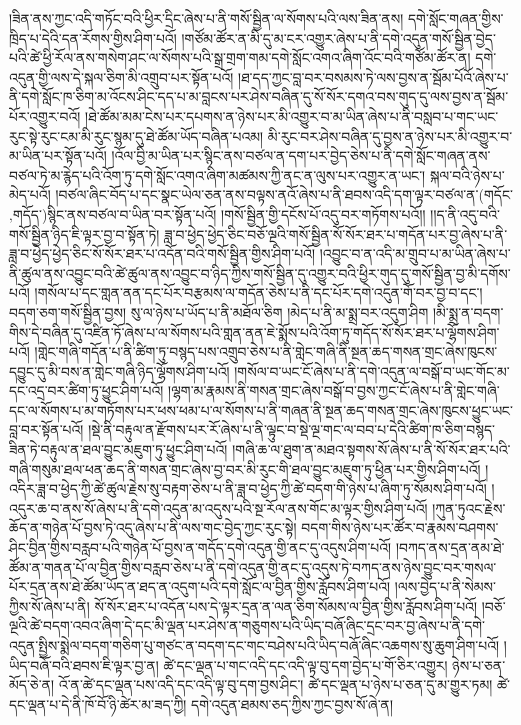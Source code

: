 །ཟིན་ནས་ཀྱང་འདི་གཏོང་བའི་ཕྱིར་དྲིང་ཞེས་པ་ནི་གསོ་སྦྱིན་ལ་སོགས་པའི་ལས་ཟིན་ནས། དགེ་སློང་གཞན་གྱིས་ཁྲིད་པ་དེའི་དན་རོགས་གྱིས་ཤིག་པའོ། །གཙོམ་ཚོར་ན་མི་དུ་མ་ངར་འགྱུར་ཞེས་པ་ནི་དགེ་འདུན་གསོ་སྦྱིན་བྱེད་པའི་ཚེ་ཕྱི་རོལ་ནས་གསེག་ཤང་ལ་སོགས་པའི་སྒྲ་གྲག་གམ་དགེ་སློང་འགའ་ཞིག་འོང་བའི་གཙོམ་ཚོར་ན། དགེ་འདུན་གྱི་ལས་དེ་སྐལ་ཅིག་མི་འགྲུབ་པར་སྟོན་པའོ། །ཐ་དད་ཀྱང་བླ་བར་བསམས་ཏེ་ལས་བྱས་ན་སྦོམ་པོའོ་ཞེས་པ་ནི་དགེ་སློང་ཁ་ཅིག་མ་འོངས་ཤིང་དད་པ་མ་བླངས་པར་ཤེས་བཞིན་དུ་སོ་སོར་དགའ་བས་གུད་དུ་ལས་བྱས་ན་སྦོམ་པོར་འགྱུར་བའོ། །ཐེ་ཚོམ་མམ་ངེས་པར་དཔགས་ན་ཉེས་པར་མི་འགྱུར་བ་མ་ཡིན་ཞེས་པ་ནི་བསླབ་པ་གང་ཡང་རུང་སྟེ་རུང་ངམ་མི་རུང་སྙམ་དུ་ཐེ་ཚོམ་ཡོད་བཞིན་པའམ། མི་རུང་བར་ཤེས་བཞིན་དུ་བྱས་ན་ཉེས་པར་མི་འགྱུར་བ་མ་ཡིན་པར་སྟོན་པའོ། །འོལ་བྱི་མ་ཡིན་པར་སྙིང་ནས་བཙལ་ན་དག་པར་བྱེད་ཅེས་པ་ནི་དགེ་སློང་གཞན་ནས་བཙལ་ཏེ་མ་རྙེད་པའི་འོག་ཏུ་དགེ་སློང་འགའ་ཞིག་མཚམས་ཀྱི་ནང་ན་ལུས་པར་འགྱུར་ན་ཡང་། སྐལ་བའི་ཉེས་པ་མེད་པའོ། །བཙལ་ཞིང་བོད་པ་དང་སྣང་ཡེལ་ཅན་ནས་བལྟས་ནའོ་ཞེས་པ་ནི་ཐབས་འདི་དག་ལྟར་བཙལ་ན་(གདོང་‚གདོད་)སྙིང་ནས་བཙལ་བ་ཡིན་བར་སྟོན་པའོ། །གསོ་སྦྱིན་གྱི་དངོས་པོ་འདུ་བར་གཏོགས་པའོ།། །།ད་ནི་འདུ་བའི་གསོ་སྦྱིན་ཉིད་ཇི་ལྟར་བྱ་བ་སྟོན་ཏེ། ཟླ་བ་ཕྱེད་ཕྱེད་ཅིང་བཅོ་ལྔའི་གསོ་སྦྱིན་སོ་སོར་ཐར་པ་གདོན་པར་བྱ་ཞེས་པ་ནི་ཟླ་བ་ཕྱེད་ཕྱེད་ཅིང་སོ་སོར་ཐར་པ་འདོན་བའི་གསོ་སྦྱིན་གྱིས་ཤིག་པའོ། །འབྱུང་བ་ན་འདི་མ་གྲུབ་པ་མ་ཡིན་ཞེས་པ་ནི་ཚུལ་ནས་འབྱུང་བའི་ཚེ་ཚུལ་ནས་འབྱུང་བ་ཉིད་ཀྱིས་གསོ་སྦྱིན་དུ་འགྱུར་བའི་ཕྱིར་གུད་དུ་གསོ་སྦྱིན་བྱ་མི་དགོས་པའོ། །གསོལ་པ་དང་གླན་ནན་དང་པོར་བརྩམས་ལ་གདོན་ཅེས་པ་ནི་དང་པོར་དགེ་འདུན་གོ་བར་བྱ་བ་དང་། བདག་ཅག་གསོ་སྦྱིན་བྱས། སུ་ལ་ཉེས་པ་ཡོད་པ་ནི་མཐོལ་ཅིག །མེད་པ་ནི་མ་སྨྲ་བར་འདུག་ཤིག །མི་སྨྲ་ན་བདག་གིས་དེ་བཞིན་དུ་འཛིན་ཏོ་ཞེས་པ་ལ་སོགས་པའི་གླན་ནན་ཇེ་སྨོས་པའི་འོག་ཏུ་གདོད་སོ་སོར་ཐར་པ་ལྷོགས་ཤིག་པའོ། །གླེང་གཞི་གདོན་པ་ནི་ཚིག་ཏུ་བསྙད་པས་འགྲུབ་ཅེས་པ་ནི་གླེང་གཞི་ནི་སྔན་ཆད་གསན་གྲང་ཞེས་ཁུངས་དབྱུང་དུ་མི་བས་ན་གླེང་གཞི་ཉིད་ལྷོགས་ཤིག་པའོ། །གསོལ་བ་ཡང་ངོ་ཞེས་པ་ནི་དགེ་འདུན་ལ་བསྒོ་བ་ཡང་གོང་མ་དང་འདྲ་བར་ཚིག་ཏུ་ཕྱུང་ཤིག་པའོ། །ལྷག་མ་རྣམས་ནི་གསན་གྲང་ཞེས་བསྒོ་བ་བྱས་ཀྱང་ངོ་ཞེས་པ་ནི་གླེང་གཞི་དང་ལ་སོགས་པ་མ་གཏོགས་པར་ཕས་ཕམ་པ་ལ་སོགས་པ་ནི་གཞན་ནི་སྔན་ཆད་གསན་གྲང་ཞེས་ཁུངས་ཕྱུང་ཡང་བླ་བར་སྟོན་པའོ། །སྡེ་ནི་བརྟུལ་ན་རྫོགས་པར་རོ་ཞེས་པ་ནི་ལྟུང་བ་སྡེ་ལྔ་གང་ལ་བབ་པ་དེའི་ཚིག་ཁ་ཅིག་བསྙད་ཟིན་ཏེ་བརྟུལ་ན་ཐལ་བྱུང་མཇུག་ཏུ་ཕྱུང་ཤིག་པའོ། །གཞི་ཆ་ལ་ཐུག་ན་མཐའ་སྟགས་སོ་ཞེས་པ་ནི་སོ་སོར་ཐར་པའི་གཞི་གསུམ་ཐལ་ཕན་ཆད་ནི་གསན་གྲང་ཞེས་བྱ་བར་མི་རུང་གི་ཐལ་བྱུང་མཇུག་ཏུ་ཕྱིན་པར་གྱིས་ཤིག་པའོ། །འདིར་ཟླ་བ་ཕྱེད་ཀྱི་ཚེ་ཚུལ་རྗེས་སུ་བརྟག་ཅེས་པ་ནི་ཟླ་བ་ཕྱེད་ཀྱི་ཚེ་བདག་གི་ཉེས་པ་ཞིག་ཏུ་སོམས་ཤིག་པའོ། །འདུར་ཆ་བ་ནས་སོ་ཞེས་པ་ནི་དགེ་འདུན་མ་འདུས་པའི་སྔ་རོལ་ནས་གོང་མ་ལྟར་གྱིས་ཤིག་པའོ། །ཀུན་ཏུའང་རྗེས་ཆོད་ན་གཉེན་པོ་བྱས་ཏེ་འདུ་ཞེས་པ་ནི་ལས་གང་བྱེད་ཀྱང་རུང་སྟེ། བདག་གིས་ཉེས་པར་ཚོར་བ་རྣམས་བཤགས་ཤིང་བྱིན་གྱིས་བརླབ་པའི་གཉེན་པོ་བྱས་ན་གདོད་དགེ་འདུན་གྱི་ནང་དུ་འདུས་ཤིག་པའོ། །བཀད་ནས་དྲན་ནམ་ཐེ་ཚོམ་ན་གནན་པོ་ལ་བྱིན་གྱིས་བརླབ་ཅེས་པ་ནི་དགེ་འདུན་གྱི་ནང་དུ་འདུས་ཏེ་བཀད་ནས་ཉེས་བྱུང་བར་གསལ་པོར་དྲན་ནས་ཐེ་ཚོམ་ཡོད་ན་ཐད་ན་འདུག་པའི་དགེ་སློང་ལ་བྱིན་གྱིས་རློབས་ཤིག་པའོ། །ལས་བྱེད་པ་ནི་སེམས་ཀྱིས་སོ་ཞེས་པ་ནི། སོ་སོར་ཐར་པ་འདོན་པས་དེ་ལྟར་དྲན་ན་ལན་ཅིག་སོམས་ལ་བྱིན་གྱིས་རློབས་ཤིག་པའོ། །བཅོ་ལྔའི་ཚེ་བདག་འབའ་ཞིག་དེ་དང་མི་ལྡན་པར་ཤེས་ན་གཅུགས་པའི་ཡིད་བཞོ་ཞིང་དྲང་བར་བྱ་ཞེས་པ་ནི་དགེ་འདུན་སྤྱིས་སྨེལ་བདག་གཅིག་པུ་གཙང་ན་བདག་དང་གང་བཤེས་པའི་ཡིད་བཞོ་ཞིང་འཆགས་སུ་ཆུག་ཤིག་པའོ། །ཡིད་བཞོ་བའི་ཐབས་ཇི་ལྟར་བྱ་ན། ཚེ་དང་ལྡན་པ་གང་འདི་དང་འདི་ལྟ་བུ་དག་བྱེད་པ་གོ་ཅིར་འགྱུར། ཉེས་པ་ཅན་མོད་ཅེ་ན། འོ་ན་ཚེ་དང་ལྡན་པས་འདི་དང་འདི་ལྟ་བུ་དག་བྱས་ཤིང་། ཚེ་དང་ལྡན་པ་ཉེས་པ་ཅན་དུ་མ་གྱུར་ཏམ། ཚེ་དང་ལྡན་པ་དེ་ནི་ཁོ་བོ་ཉི་ཚེར་མ་ཟད་ཀྱི། དགེ་འདུན་ཐམས་ཅད་ཀྱིས་ཀྱང་བྱས་སོ་ཞེ་ན། 